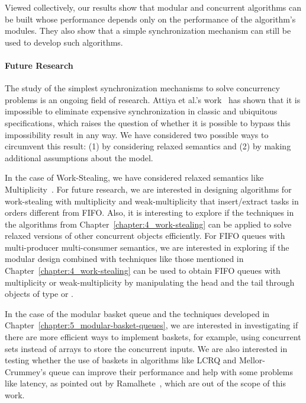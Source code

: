 Viewed collectively, our results show that modular and concurrent algorithms can be built whose performance depends only on the performance of the algorithm's modules. They also show that a simple synchronization mechanism can still be used to develop such algorithms.

\paragraph{Future Research}

The study of the simplest synchronization mechanisms to solve concurrency problems is an ongoing field of research. Attiya et al.'s work~\cite{DBLP_conf_popl_AttiyaGHKMV11} has shown that it is impossible to eliminate expensive synchronization in classic and ubiquitous specifications, which raises the question of whether it is possible to bypass this impossibility result in any way. We have considered two possible ways to circumvent this result: (1) by considering relaxed semantics and (2) by making additional assumptions about the model.

In the case of Work-Stealing, we have considered relaxed semantics like Multiplicity~\cite{DBLP_journals_dc_CastanedaRR23, DBLP_conf_opodis_CastanedaRR20}. For future research, we are interested in designing algorithms for work-stealing with multiplicity and weak-multiplicity that insert/extract tasks in orders different from FIFO. Also, it is interesting to explore if the techniques in the algorithms from Chapter~\ref{chapter:4_work-stealing} can be applied to solve relaxed versions of other concurrent objects efficiently. For FIFO queues with multi-producer multi-consumer semantics, we are interested in exploring if the modular design combined with techniques like those mentioned in Chapter~\ref{chapter:4_work-stealing} can be used to obtain FIFO queues with multiplicity or weak-multiplicity by manipulating the head and the tail through objects of type \MaxR or \RMaxR.

In the case of the modular basket queue and the techniques developed in Chapter~\ref{chapter:5_modular-basket-queues}, we are interested in investigating if there are more efficient ways to implement baskets, for example, using concurrent sets instead of arrays to store the concurrent inputs. We are also interested in testing whether the use of baskets in algorithms like LCRQ and Mellor-Crummey’s queue can improve their performance and help with some problems like latency, as pointed out by Ramalhete~\cite{Ramalhete_Correia_MPMC_2016}, which are out of the scope of this work.

